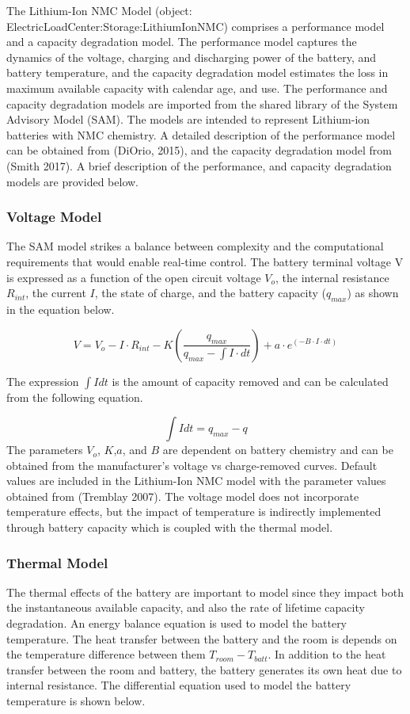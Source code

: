 The Lithium-Ion NMC Model (object: ElectricLoadCenter:Storage:LithiumIonNMC) comprises a performance model and a capacity degradation model. The performance model captures the dynamics of the voltage, charging and discharging power of the battery, and battery temperature, and the capacity degradation model  estimates the loss in maximum available capacity with calendar age, and use. The performance and capacity degradation models are imported from the shared library of the System Advisory Model (SAM). The models are intended to represent Lithium-ion batteries with NMC chemistry. A detailed description of the performance model can be obtained from (DiOrio, 2015), and the capacity degradation model from (Smith 2017). A brief description of the performance, and capacity degradation models are provided below. 

\subsubsection{Voltage Model}
 The SAM model strikes a balance between complexity and the computational requirements that would enable real-time control. The battery terminal voltage V is expressed as a function of the open circuit voltage $V_o$, the internal resistance $R_{int}$, the current $I$, the state of charge, and the battery capacity ($q_{max}$) as shown in the equation below.

\begin{equation}
 V=V_o-I\cdot R_{int}-K \left(\frac{q_{max}}{q_{max}-\int{I\cdot dt}}\right)+a\cdot e^{(-B \cdot I\cdot dt)}
\label{Equation: Voltage}
\end{equation}

The expression $\int{Idt}$ is the amount of capacity removed and can be calculated from the following equation. 

\begin{equation}
\int{Idt} = q_{max} - q
\label{Equation: charge_removed}
\end{equation}
The parameters $V_o$, $K$,$a$, and $B$ are dependent on battery chemistry and can be obtained from the manufacturer's voltage vs charge-removed curves. Default values are included in the Lithium-Ion NMC model with the parameter values obtained from   (Tremblay 2007). The voltage model does not incorporate temperature effects, but the impact of temperature is indirectly implemented through battery capacity which is coupled with the thermal model. 

\subsubsection{Thermal Model}
The thermal effects of the battery are important to model since they impact both the instantaneous available capacity, and also the rate of lifetime capacity degradation. An energy balance equation is used to model the battery temperature. The heat transfer between the battery and the room is depends on the temperature difference between them $T_{room}-T_{batt}$. In addition to the heat transfer between the room and battery, the battery generates its own heat due to internal resistance. The differential equation used to model the battery temperature is shown below. 

